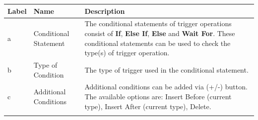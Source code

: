 \begin{enumerate}
  \begin{longtable}[]{@{}lll@{}}
  \toprule
  \begin{minipage}[b]{0.08\columnwidth}\raggedright
  Label\strut
  \end{minipage} & \begin{minipage}[b]{0.22\columnwidth}\raggedright
  Name\strut
  \end{minipage} & \begin{minipage}[b]{0.62\columnwidth}\raggedright
  Description\strut
  \end{minipage}\tabularnewline
  \midrule
  \endhead
  \begin{minipage}[t]{0.08\columnwidth}\raggedright
  a\strut
  \end{minipage} & \begin{minipage}[t]{0.22\columnwidth}\raggedright
  Conditional Statement\strut
  \end{minipage} & \begin{minipage}[t]{0.62\columnwidth}\raggedright
  The conditional statements of trigger operations consist of
  \textbf{If}, \textbf{Else If}, \textbf{Else} and \textbf{Wait For}.
  These conditional statements can be used to check the type(s) of
  trigger operation.\strut
  \end{minipage}\tabularnewline
  \begin{minipage}[t]{0.08\columnwidth}\raggedright
  b\strut
  \end{minipage} & \begin{minipage}[t]{0.22\columnwidth}\raggedright
  Type of Condition\strut
  \end{minipage} & \begin{minipage}[t]{0.62\columnwidth}\raggedright
  The type of trigger used in the conditional statement.\strut
  \end{minipage}\tabularnewline
  \begin{minipage}[t]{0.08\columnwidth}\raggedright
  c\strut
  \end{minipage} & \begin{minipage}[t]{0.22\columnwidth}\raggedright
  Additional Conditions\strut
  \end{minipage} & \begin{minipage}[t]{0.62\columnwidth}\raggedright
  Additional conditions can be added via (+/-) button. The available
  options are: Insert Before (current type), Insert After (current
  type), Delete.\strut
  \end{minipage}\tabularnewline
  \begin{minipage}[t]{0.08\columnwidth}\raggedright

\end{minipage}
\end{longtable}
\end{enumerate}
